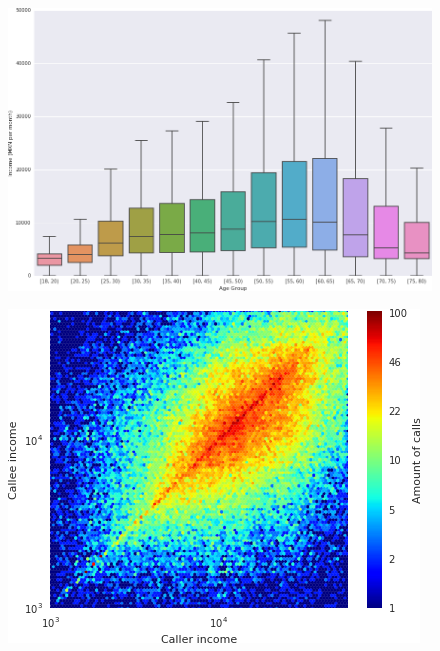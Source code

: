 \begin{figure}[]
\begin{center}
\includegraphics[width=1\columnwidth]{figures/income_age_boxplot4/income_age_boxplot4.png}
\caption{ \protect}
\end{center}
\end{figure}





\begin{figure}[]
\begin{center}
\includegraphics[width=1\columnwidth]{figures/Homophily_income_origin_target_1/Homophily_income_origin_target_1.png}
\caption{ \protect}
\end{center}
\end{figure}







{}


